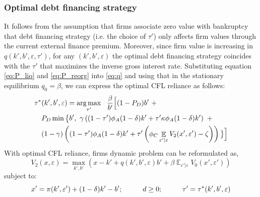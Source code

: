 \documentclass[12pt]{article}
\DeclareMathOperator{\E}{\mathbb{E}}
\DeclareMathOperator*{\argmax}{arg\,max}
\begin{document}
\subsubsection{Optimal debt financing strategy}
It follows from the assumption that firms associate zero value with bankruptcy that debt financing strategy (i.e. the choice of $\tau'$) only affects firm values through the current external finance premium. Moreover, since firm value is increasing in $q(k',b',\varepsilon, \tau')$, for any $(k',b',\varepsilon)$ the optimal debt financing strategy coincides with the $\tau'$ that maximizes the inverse gross interest rate. Substituting equation \ref{eq:P_liq} and \ref{eq:P_reorg} into \ref{eq:q} and using that in the stationary equilibrium $q_0 = \beta$, we can express the optimal CFL reliance as follows:
\begin{equation} \label{eq:opt_tau}
    \begin{split}
        & \tau^*(k',b',\varepsilon) = \argmax_{\tau'} \ \  \frac{\beta}{b'} \Big{[} (1-P_D)b' \ +  \\
        & \quad  P_D \min \big{\{} b', \ \gamma \left((1-\tau') \phi_A (1-\delta) k' +\tau' \kappa \phi_A  (1-\delta) k' \right) \ +  \\
        & \quad (1-\gamma) \left( (1-\tau') \phi_A (1-\delta) k' +\tau' \left( \phi_C \E_{\varepsilon'|\varepsilon}V_2 (x', \varepsilon') - \zeta \right) \right) \big{\}} \Big{]} 
    \end{split}
 \end{equation}
With optimal CFL reliance, firms dynamic problem can be reformulated as, 
\begin{equation} \label{eq:V_2}
    V_2(x,\varepsilon) = \max_{k',b'} \left(x - k' +  q(k',b',\varepsilon)b' + \beta \E_{\varepsilon'|\varepsilon} V_0(x',\varepsilon') \right)
    \end{equation}
    subject to: 
    \begin{equation} \label{eq:cont_1}
    x' = \pi(k',\varepsilon')+(1-\delta)k'-b'; \hspace{10mm} d \geq 0;  \hspace{10mm} \tau' = \tau^*(k',b',\varepsilon)
    \end{equation}
    
\end{document}

